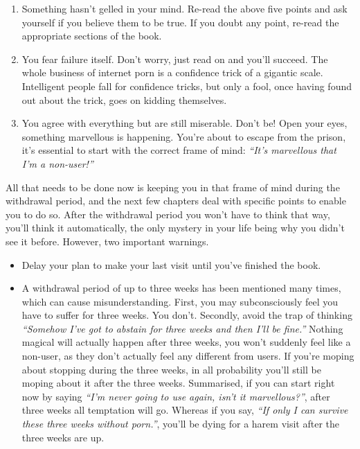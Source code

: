 \documentclass[
]{book}
\begin{document}
\begin{enumerate}
\def\labelenumi{\arabic{enumi}.}
\item
  Something hasn't gelled in your mind. Re-read the above five points and ask yourself if you believe them to be true. If you doubt any point, re-read the appropriate sections of the book.
\item
  You fear failure itself. Don't worry, just read on and you'll succeed. The whole business of internet porn is a confidence trick of a gigantic scale. Intelligent people fall for confidence tricks, but only a fool, once having found out about the trick, goes on kidding themselves.
\item
  You agree with everything but are still miserable. Don't be! Open your eyes, something marvellous is happening. You're about to escape from the prison, it's essential to start with the correct frame of mind: \emph{``It's marvellous that I'm a non-user!''}
\end{enumerate}

All that needs to be done now is keeping you in that frame of mind during the withdrawal period, and the next few chapters deal with specific points to enable you to do so. After the withdrawal period you won't have to think that way, you'll think it automatically, the only mystery in your life being why you didn't see it before. However, two important warnings.

\begin{itemize}
\item
  Delay your plan to make your last visit until you've finished the book.
\item
  A withdrawal period of up to three weeks has been mentioned many times, which can cause misunderstanding. First, you may subconsciously feel you have to suffer for three weeks. You don't. Secondly, avoid the trap of thinking \emph{``Somehow I've got to abstain for three weeks and then I'll be fine.''} Nothing magical will actually happen after three weeks, you won't suddenly feel like a non-user, as they don't actually feel any different from users. If you're moping about stopping during the three weeks, in all probability you'll still be moping about it after the three weeks. Summarised, if you can start right now by saying \emph{``I'm never going to use again, isn't it marvellous?''}, after three weeks all temptation will go. Whereas if you say, \emph{``If only I can survive these three weeks without porn.''}, you'll be dying for a harem visit after the three weeks are up.
\end{itemize}
\end{document}
